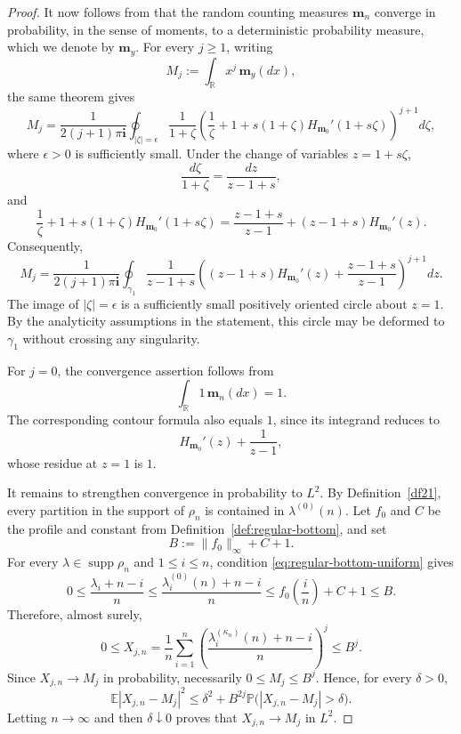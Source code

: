\documentclass[11pt]{amsart}
\theoremstyle{plain}
\numberwithin{equation}{section}
\numberwithin{theorem}{section}
\numberwithin{figure}{section}
\begin{document}
\begin{proof}
It now follows from \cite[Theorem~2.4]{bg16} that the random counting
measures \(\mathbf m_n\) converge in probability, in the sense of
moments, to a deterministic probability measure, which we denote by
\(\mathbf m_y\). For every \(j\geq1\), writing
\[
    M_j:=\int_{\mathbb R}x^j\,\mathbf m_y(dx),
\]
the same theorem gives
\[
    M_j
    =
    \frac{1}{2(j+1)\pi\mathbf i}
    \oint_{|\zeta|=\epsilon}
    \frac{1}{1+\zeta}
    \left(
        \frac1\zeta+1+
        s(1+\zeta)
        H_{\mathbf m_0}'(1+s\zeta)
    \right)^{j+1}
    d\zeta,
\]
where \(\epsilon>0\) is sufficiently small. Under the change of
variables \(z=1+s\zeta\),
\[
    \frac{d\zeta}{1+\zeta}
    =
    \frac{dz}{z-1+s},
\]
and
\[
    \frac1\zeta+1+
    s(1+\zeta)H_{\mathbf m_0}'(1+s\zeta)
    =
    \frac{z-1+s}{z-1}
    +(z-1+s)H_{\mathbf m_0}'(z).
\]
Consequently,
\[
    M_j
    =
    \frac{1}{2(j+1)\pi\mathbf i}
    \oint_{\gamma_1}
    \frac{1}{z-1+s}
    \left(
        (z-1+s)H_{\mathbf m_0}'(z)
        +\frac{z-1+s}{z-1}
    \right)^{j+1}
    dz.
\]
The image of \(|\zeta|=\epsilon\) is a sufficiently small positively
oriented circle about \(z=1\). By the analyticity assumptions in the
statement, this circle may be deformed to \(\gamma_1\) without
crossing any singularity.

For \(j=0\), the convergence assertion follows from
\[
    \int_{\mathbb R}1\,\mathbf m_n(dx)=1.
\]
The corresponding contour formula also equals \(1\), since its
integrand reduces to
\[
    H_{\mathbf m_0}'(z)+\frac1{z-1},
\]
whose residue at \(z=1\) is \(1\).

It remains to strengthen convergence in probability to \(L^2\).
By Definition~\ref{df21}, every partition in the support of \(\rho_n\)
is contained in \(\lambda^{(0)}(n)\). Let \(f_0\) and \(C\) be the
profile and constant from Definition~\ref{def:regular-bottom}, and set
\[
    B:=\lVert f_0\rVert_\infty+C+1.
\]
For every \(\lambda\in\operatorname{supp}\rho_n\) and
\(1\leq i\leq n\), condition
\eqref{eq:regular-bottom-uniform} gives
\[
    0
    \leq
    \frac{\lambda_i+n-i}{n}
    \leq
    \frac{\lambda_i^{(0)}(n)+n-i}{n}
    \leq
    f_0\left(\frac{i}{n}\right)+C+1
    \leq B.
\]
Therefore, almost surely,
\[
    0\leq
    X_{j,n}
    =
    \frac1n\sum_{i=1}^n
    \left(
        \frac{\lambda_i^{(\kappa_n)}(n)+n-i}{n}
    \right)^j
    \leq B^j.
\]
Since \(X_{j,n}\to M_j\) in probability, necessarily
\(0\leq M_j\leq B^j\). Hence, for every \(\delta>0\),
\[
    \mathbb E|X_{j,n}-M_j|^2
    \leq
    \delta^2+
    B^{2j}
    \mathbb P\bigl(|X_{j,n}-M_j|>\delta\bigr).
\]
Letting \(n\to\infty\) and then \(\delta\downarrow0\) proves that
\(X_{j,n}\to M_j\) in \(L^2\).



\end{proof}
\end{document}
